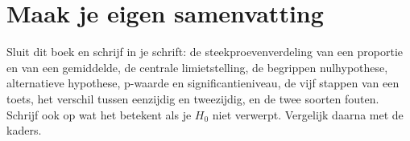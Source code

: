 
\begin{oefeningen}






\end{oefeningen}


\ifzelfstudie
\section*{Maak je eigen samenvatting}
Sluit dit boek en schrijf in je schrift: de steekproevenverdeling van een proportie en van een gemiddelde, de centrale limietstelling, de begrippen nulhypothese, alternatieve hypothese, p-waarde en significantieniveau, de vijf stappen van een toets, het verschil tussen eenzijdig en tweezijdig, en de twee soorten fouten. Schrijf ook op wat het betekent als je $H_0$ niet verwerpt. Vergelijk daarna met de kaders.
\fi
